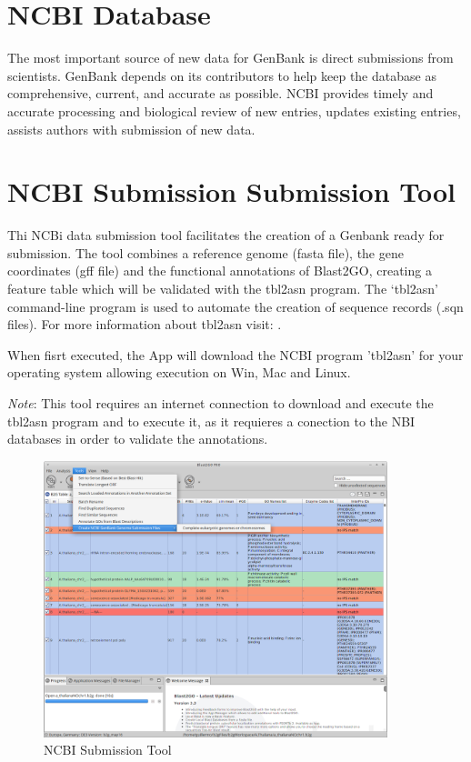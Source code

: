 
\section{NCBI Database}

The most important source of new data for GenBank is direct submissions from
scientists. GenBank depends on its contributors to help keep the database as
comprehensive, current, and accurate as possible. NCBI provides timely and accurate
processing and biological review of new entries, updates existing entries,
assists authors with submission of new data.

\section{NCBI Submission Submission Tool}
Thi NCBi data submission tool facilitates the creation of a Genbank ready for
submission.
The tool combines a reference genome (fasta file), the gene coordinates (gff
file) and the functional annotations of Blast2GO, creating a feature table
which will be validated with the tbl2asn program.
The `tbl2asn' command-line program is used to  automate the creation of
sequence records (.sqn files).
For more information about  tbl2asn visit:
.

When fisrt executed, the App will download the NCBI program
'tbl2asn' for your operating system allowing execution on Win, Mac and
Linux.
\par\textit{Note}: This tool requires an internet connection to download and
execute the tbl2asn program and to execute it, as it requieres a conection to
the NBI databases in order to validate the annotations.

\begin{figure}[!h] \centering
\includegraphics[width=100mm,scale=0.9]{img/Blast2GOPROmaimmenu.png}
\caption{NCBI Submission Tool}
\label{fig:ncbisubtool}
\end{figure}

